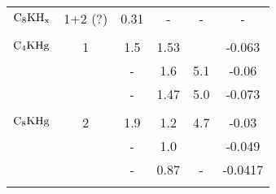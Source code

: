 \begin{tabular}{|lc|cccc|}
$\rm C_8KH_x$ & 1+2 (?) & 0.31\cite{suzuki85b} & - & - & -\\
& & & & & \\
$\rm C_4KHg$ & 1 & 1.5\cite{W179} & 1.53\cite{W179} &  & -0.063\cite{W179}\\
& &-& 1.6\cite{yang88} & 5.1\cite{yang88} & -0.06\cite{yang88}\\
& &-& 1.47\cite{preil84} & 5.0\cite{fischer85} & -0.073\cite{conard81}\\
& & & & & \\
$\rm C_8KHg$ & 2 & 1.9\cite{pendrys81} & 1.2 & 4.7\cite{yang88} & -0.03\cite{yang88} \\
& &-& 1.0\cite{W179}  &  & -0.049\cite{W179} \\
& &-& 0.87\cite{preil84} &-& -0.0417\cite{preil84}\\
\hline\\
\end{tabular}

